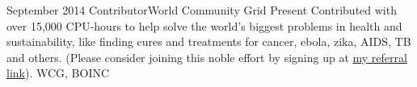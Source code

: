 %
%
%

\begin{volunteers}
  \volunteer
    {September 2014} {Contributor}{World Community Grid}
    {Present} {
                Contributed with over 15,000 CPU-hours to help solve the 
                world's biggest problems in health and sustainability, like 
                finding cures and treatments for cancer, ebola, zika, AIDS, 
                TB and others. (Please consider joining this noble effort by 
                signing up at 
                \href{https://join.worldcommunitygrid.org?recruiterId=946192}
                {my referral link}).
              }
              {WCG, BOINC}
  \emptySeparator
\end{volunteers}
